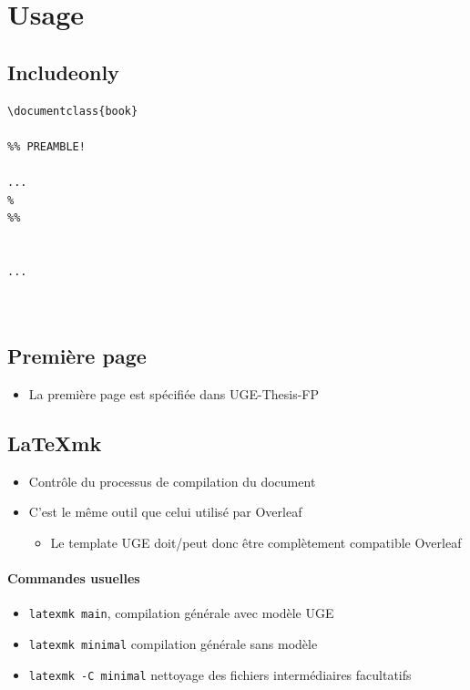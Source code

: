 \section{Usage}

\subsection{Includeonly}


\centering\begin{boxedminipage}{.5\columnwidth}\small
\begin{verbatim}
\documentclass{book}

%% PREAMBLE!

...
%
%%


...



\end{verbatim}
    
  \end{boxedminipage}

\subsection{Première page}

\begin{itemize}
\item La première page est spécifiée dans UGE-Thesis-FP
\end{itemize}
\subsection{LaTeXmk}

\begin{itemize}
\item Contrôle du processus de compilation du document
\item C'est le même outil que celui utilisé par Overleaf
  \begin{itemize}
  \item Le template UGE doit/peut donc être complètement compatible Overleaf
  \end{itemize}
\end{itemize}

\paragraph{Commandes usuelles}

\begin{itemize}
\item \texttt{latexmk main}, compilation générale avec modèle UGE
\item \texttt{latexmk minimal} compilation générale sans modèle
\item \texttt{latexmk -C minimal} nettoyage des fichiers intermédiaires facultatifs
\end{itemize}


